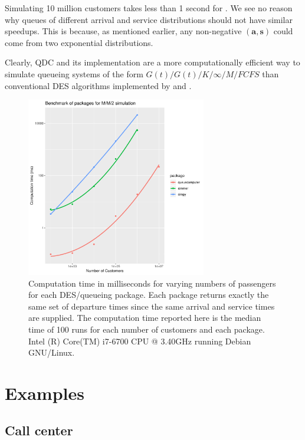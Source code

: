 \documentclass[article]{jss}
\begin{document}
Simulating 10 million customers takes less than 1 second for . We see no reason why queues of different arrival and service distributions should not have similar speedups. This is because, as mentioned earlier, any non-negative $\mathbf{(a,s)}$ could come from two exponential distributions. 

Clearly, QDC and its implementation  are a more computationally efficient way to simulate queueing systems of the form $G(t)/G(t)/K/\infty/M/\mathit{FCFS}$ than conventional DES algorithms implemented by  and . 

\begin{figure}[t!]
  \centering
  \includegraphics[width = 0.7\textwidth, trim = 0 5 0 5, clip]{benchmark_083.pdf}
  \caption{Computation time in milliseconds for varying numbers of
    passengers for each DES/queueing package. Each package returns
    exactly the same set of departure times since the same arrival and
    service times are supplied. The computation time reported here is
    the median time of 100 runs for each number of customers and each
    package. Intel (R) Core(TM) i7-6700 CPU @ 3.40GHz running Debian
    GNU/Linux.  }
  \label{fig:bm_numberofpassengers}
\end{figure}

\section{Examples} \label{sec:Examples}

\subsection{Call center} \label{ssec:callcenter}
\end{document}
